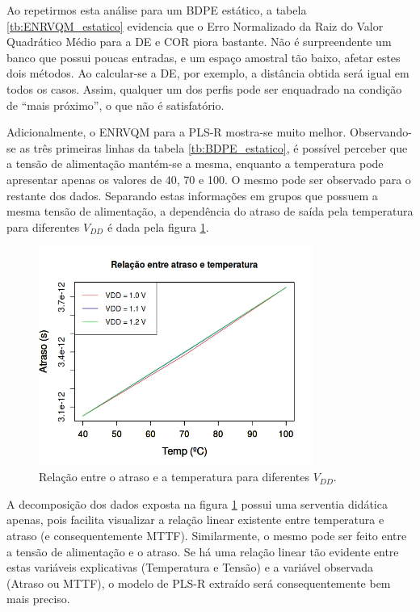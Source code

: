 Ao repetirmos esta análise para um BDPE estático, a tabela \ref{tb:ENRVQM_estatico} evidencia que o Erro Normalizado da Raiz do Valor Quadrático Médio para a DE e COR piora bastante. Não é surpreendente um banco que possui poucas entradas, e um espaço amostral tão baixo, afetar estes dois métodos. Ao calcular-se a DE, por exemplo, a distância obtida será igual em todos os casos. Assim, qualquer um dos perfis pode ser enquadrado na condição de ``mais próximo'', o que não é satisfatório.

Adicionalmente, o ENRVQM para a PLS-R mostra-se muito melhor. Observando-se as três primeiras linhas da tabela \ref{tb:BDPE_estatico}, é  possível perceber que a tensão de alimentação mantém-se a mesma, enquanto a temperatura pode apresentar apenas os valores de 40, 70 e 100. O mesmo pode ser observado para o restante dos dados. Separando estas informações em grupos que possuem a mesma tensão de alimentação, a dependência do atraso de saída pela temperatura para diferentes $V_{DD}$ é dada pela figura \ref{figure:Temp_atraso_VDDcte}.
\begin{figure}[H]
	\center
	\includegraphics[width=0.8\textwidth]{images/Temp_atraso_VDDcte}
	\caption{Relação entre o atraso e a temperatura para diferentes $V_{DD}$.}
	\label{figure:Temp_atraso_VDDcte}	
\end{figure}

A decomposição dos dados exposta na figura \ref{figure:Temp_atraso_VDDcte} possui uma serventia didática apenas, pois facilita visualizar a relação linear existente entre temperatura e atraso (e consequentemente MTTF). Similarmente, o mesmo pode ser feito entre a tensão de alimentação e o atraso. Se há uma relação linear tão evidente entre estas variáveis explicativas (Temperatura e Tensão) e a variável observada (Atraso ou MTTF), o modelo de PLS-R extraído será consequentemente bem mais preciso.

